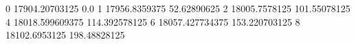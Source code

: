 0 17904.20703125 0.0
1 17956.8359375 52.62890625
2 18005.7578125 101.55078125
4 18018.599609375 114.392578125
6 18057.427734375 153.220703125
8 18102.6953125 198.48828125
